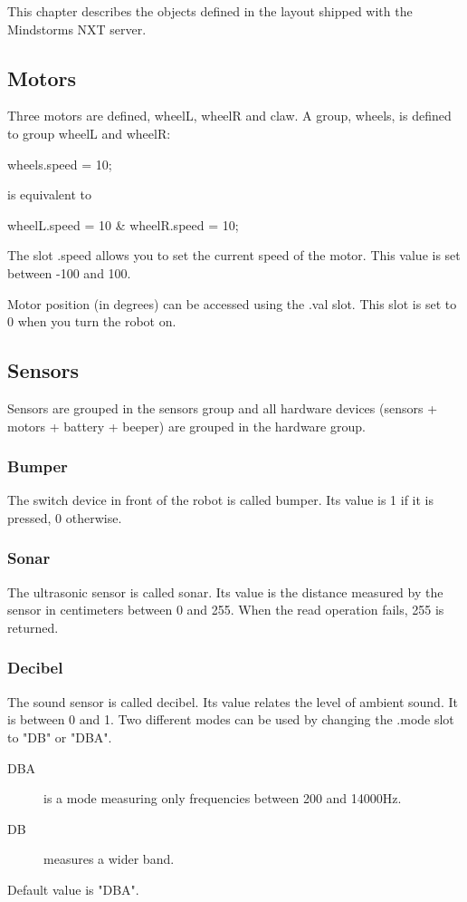 This chapter describes the objects defined in the  layout
shipped with the \urbi Mindstorms NXT server.
\subsection{Motors}
Three motors are defined, wheelL, wheelR and claw.
A group, wheels, is defined to group wheelL and wheelR:
\begin{urbiunchecked}
  wheels.speed = 10;
\end{urbiunchecked}

is equivalent to
\begin{urbiunchecked}
  wheelL.speed = 10 & wheelR.speed = 10;
\end{urbiunchecked}

The slot .speed allows you to set the current speed of the motor. This
value is set between -100 and 100.

Motor position (in degrees) can be accessed using the .val slot. This
slot is set to 0 when you turn the robot on.

\subsection{Sensors}
Sensors are grouped in the sensors group and all hardware devices (sensors +
motors + battery + beeper) are grouped in the hardware group.
\subsubsection{Bumper}
The switch device in front of the robot is called bumper. Its value is 1 if it
is pressed, 0 otherwise.
\subsubsection{Sonar}
The ultrasonic sensor is called sonar.
Its value is the distance measured by the sensor in centimeters between 0 and
255. When the read operation fails, 255 is returned.
\subsubsection{Decibel}
The sound sensor is called decibel.
Its value relates the level of ambient sound. It is between 0 and 1.
Two different modes can be used by changing the .mode slot to "DB" or
"DBA".
\begin{description}
\item[DBA] is a mode measuring only frequencies between 200 and 14000Hz.
\item[DB] measures a wider band.
\end{description}
Default value is "DBA".

